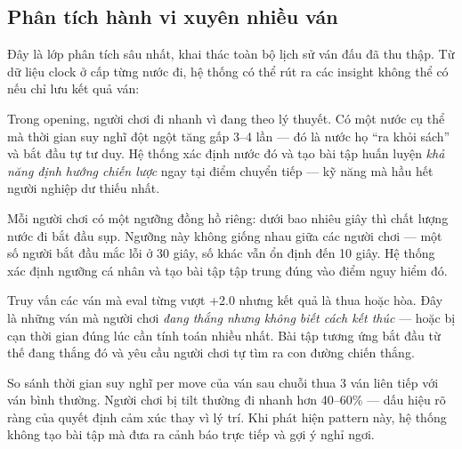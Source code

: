 \documentclass[14pt,a4paper]{extarticle}
\begin{document}
\subsection{Phân tích hành vi xuyên nhiều ván}

Đây là lớp phân tích sâu nhất, khai thác toàn bộ lịch sử ván đấu đã thu thập.
Từ dữ liệu clock ở cấp từng nước đi, hệ thống có thể rút ra các insight không
thể có nếu chỉ lưu kết quả ván:

\begin{insightbox}
Trong opening, người chơi đi nhanh vì đang theo lý thuyết. Có một nước cụ thể
mà thời gian suy nghĩ đột ngột tăng gấp 3--4 lần --- đó là nước họ ``ra khỏi
sách'' và bắt đầu tự tư duy. Hệ thống xác định nước đó và tạo bài tập huấn
luyện \emph{khả năng định hướng chiến lược} ngay tại điểm chuyển tiếp --- kỹ
năng mà hầu hết người nghiệp dư thiếu nhất.
\end{insightbox}

\begin{insightbox}
Mỗi người chơi có một ngưỡng đồng hồ riêng: dưới bao nhiêu giây thì chất
lượng nước đi bắt đầu sụp. Ngưỡng này không giống nhau giữa các người chơi ---
một số người bắt đầu mắc lỗi ở 30 giây, số khác vẫn ổn định đến 10 giây. Hệ
thống xác định ngưỡng cá nhân và tạo bài tập tập trung đúng vào điểm nguy hiểm
đó.
\end{insightbox}

\begin{insightbox}
Truy vấn các ván mà eval từng vượt +2.0 nhưng kết quả là thua hoặc hòa. Đây là
những ván mà người chơi \emph{đang thắng nhưng không biết cách kết thúc} ---
hoặc bị cạn thời gian đúng lúc cần tính toán nhiều nhất. Bài tập tương ứng bắt
đầu từ thế đang thắng đó và yêu cầu người chơi tự tìm ra con đường chiến thắng.
\end{insightbox}

\begin{insightbox}
So sánh thời gian suy nghĩ per move của ván sau chuỗi thua 3 ván liên tiếp với
ván bình thường. Người chơi bị tilt thường đi nhanh hơn 40--60\% --- dấu hiệu
rõ ràng của quyết định cảm xúc thay vì lý trí. Khi phát hiện pattern này, hệ
thống không tạo bài tập mà đưa ra cảnh báo trực tiếp và gợi ý nghỉ ngơi.
\end{insightbox}
\end{document}
